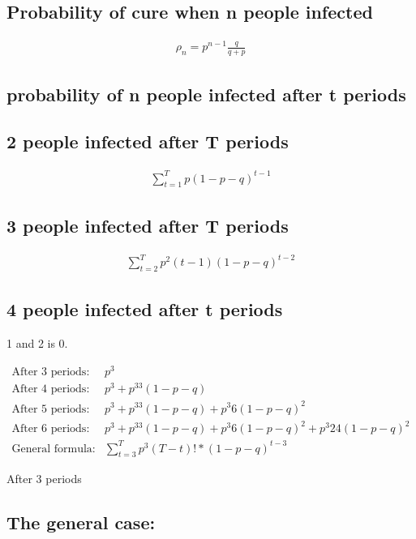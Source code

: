 \documentclass[12pt]{report}
\numberwithin{equation}{section}
\begin{document}
\subsection{Probability of cure when n people infected}

\begin{align}
\rho_n = p^{n-1}\frac{q}{q+p}
\end{align}

\subsection{probability of n people infected after t periods}

\subsection{2 people infected after T periods}

\begin{align}
 \sum_{t=1}^{T}p(1-p-q)^{t-1}
\end{align}

\subsection{3 people infected after T periods}
\begin{align}
\sum_{t=2}^{T}p^2(t-1)(1-p-q)^{t-2}
\end{align}

\subsection{4 people infected after t periods}

1 and 2 is 0. 

\begin{align}
\text{After 3 periods}:& p^3 \\
\text{After 4 periods}:& p^3 + p^33(1-p-q) \\
\text{After 5 periods}:& p^3 + p^33(1-p-q) + p^3 6(1-p-q)^2 \\
\text{After 6 periods}:& p^3 + p^33(1-p-q) + p^3 6(1-p-q)^2 + p^3 24(1-p-q)^2 \\
\text{General formula}:& \sum_{t=3}^{T}p^{3}(T-t)!*(1-p-q)^{t-3}
\end{align}

After 3 periods

\subsection{The general case:}
\end{document}
